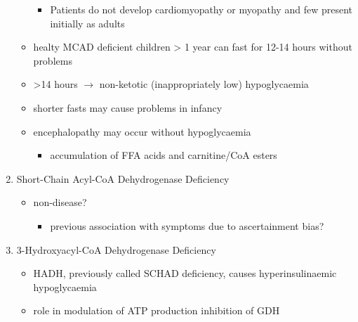 \documentclass{scrartcl}
\begin{document}
\begin{enumerate}
\begin{itemize}
\begin{itemize}
\item Patients do not develop cardiomyopathy or myopathy and few present
initially as adults
\end{itemize}
\item healty MCAD deficient children > 1 year can fast for 12-14 hours without problems
\item >14 hours \(\to\) non-ketotic (inappropriately low) hypoglycaemia
\item shorter fasts may cause problems in infancy
\item encephalopathy may occur without hypoglycaemia
\begin{itemize}
\item accumulation of FFA acids and carnitine/CoA esters
\end{itemize}
\end{itemize}

\item Short-Chain Acyl-CoA Dehydrogenase Deficiency
\label{sec:orga1e621d}
\begin{itemize}
\item non-disease?
\begin{itemize}
\item previous association with symptoms due to ascertainment bias?
\end{itemize}
\end{itemize}

\item 3-Hydroxyacyl-CoA Dehydrogenase Deficiency
\label{sec:orgba34bd0}
\begin{itemize}
\item HADH, previously called SCHAD deficiency, causes hyperinsulinaemic
hypoglycaemia
\item role in modulation of ATP production inhibition of GDH
\end{itemize}


\end{enumerate}
\end{document}
